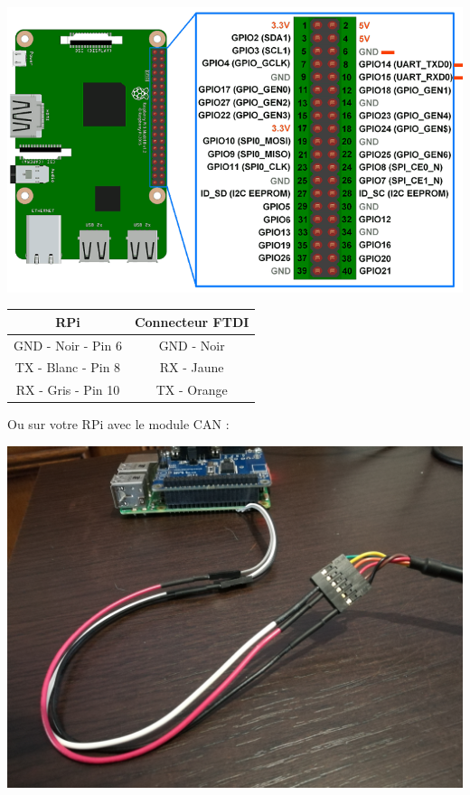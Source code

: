 \begin{centering}
  \includegraphics[height=0.4\textheight]{pictures/04_labs/rpi3_gpio_layout_uarts.png} \\
\end{centering}

\begin{center}
  \begin{tabular}{ c | c }
    \hline
    RPi & Connecteur FTDI \\ \hline
    GND - Noir - Pin 6 & GND - Noir \\
    TX - Blanc - Pin 8 & RX - Jaune \\
    RX - Gris - Pin 10 & TX - Orange \\
    \hline
  \end{tabular}
  \end{center}

Ou sur votre RPi avec le module CAN :

\begin{centering}
  \includegraphics[height=0.3\textheight]{pictures/04_labs/rpi3_pican_uarts.jpg} \\
\end{centering}

